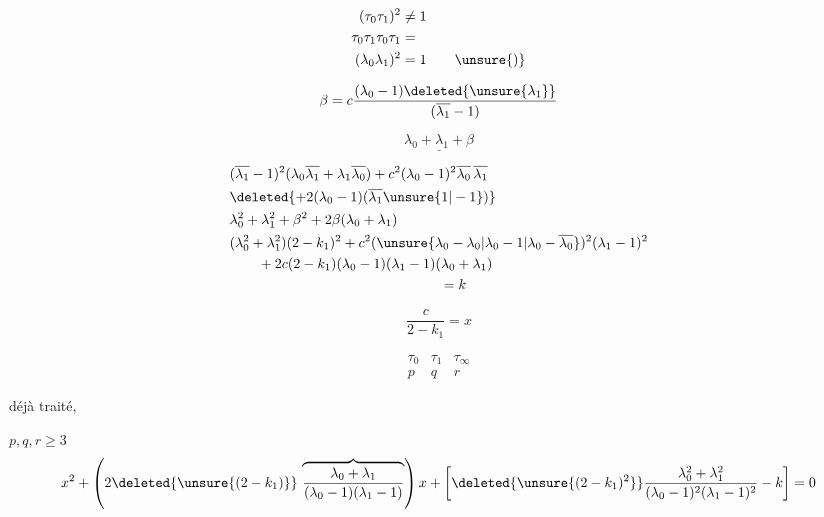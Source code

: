 \[
\begin{aligned}
(\tau_0\tau_1)^2&\ne 1\\
\tau_0\tau_1\tau_0\tau_1&=\\
(\lambda_0\lambda_1)^2&=1\qquad\unsure{)}
\end{aligned}
\]

\[
\beta=c\frac{(\lambda_0-1)\deleted{\unsure{\lambda_1}}}{(\overline{\lambda_1}-1)}
\]

\[
\underline{\lambda_0+\lambda_1+\beta}
\]

\[
\begin{aligned}
&(\overline{\lambda_1}-1)^2(\lambda_0\overline{\lambda_1}+\lambda_1\overline{\lambda_0})
+c^2(\lambda_0-1)^2\overline{\lambda_0}\,\overline{\lambda_1}\\
&\deleted{+2(\lambda_0-1)(\overline{\lambda_1}\unsure{1|-1})}\\
&\lambda_0^2+\lambda_1^2+\beta^2+2\beta(\lambda_0+\lambda_1)\\
&(\lambda_0^2+\lambda_1^2)(2-k_1)^2+c^2(\unsure{\lambda_0-\lambda_0|\lambda_0-1|\lambda_0-\overline{\lambda_0}})^2(\lambda_1-1)^2\\
&\qquad+2c(2-k_1)(\lambda_0-1)(\lambda_1-1)(\lambda_0+\lambda_1)\\
&\hspace{15em}=k
\end{aligned}
\]

\[
\frac c{2-k_1}=x
\]

\[
\begin{array}{ccc}
\tau_0&\tau_1&\tau_\infty\\p&q&r
\end{array}
\]


déjà traité,

$p,q,r\geq3$
\[
x^2+\left(2\deleted{\unsure{(2-k_1)}}\,
\overbrace{\frac{\lambda_0+\lambda_1}{(\lambda_0-1)(\lambda_1-1)}}\right)x+
\left[\deleted{\unsure{(2-k_1)^2}}\frac{\lambda_0^2+\lambda_1^2}{(\lambda_0-1)^2(\lambda_1-1)^2}-k\right]=0
\]

